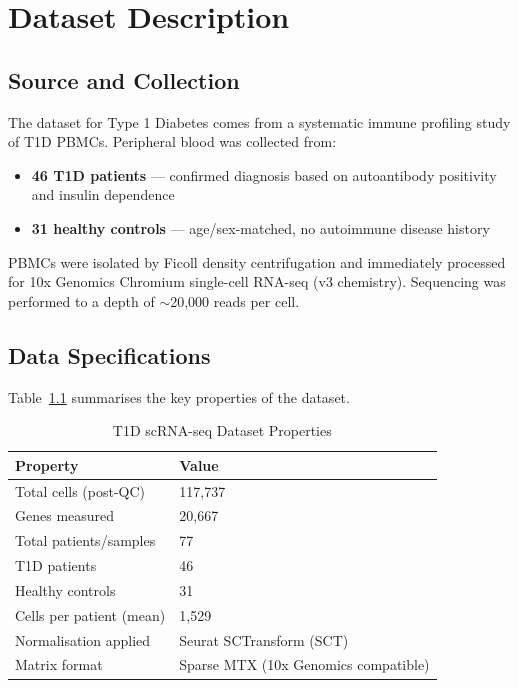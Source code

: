 \chapter{Dataset Description}
\label{chap:dataset}

\section{Source and Collection}

The dataset for Type 1 Diabetes comes from a systematic immune profiling study of T1D PBMCs. Peripheral blood was collected from:
\begin{itemize}
    \item \textbf{46 T1D patients} --- confirmed diagnosis based on autoantibody positivity and insulin dependence
    \item \textbf{31 healthy controls} --- age/sex-matched, no autoimmune disease history
\end{itemize}

PBMCs were isolated by Ficoll density centrifugation and immediately processed for 10x Genomics Chromium single-cell RNA-seq (v3 chemistry). Sequencing was performed to a depth of $\sim$20,000 reads per cell.

\section{Data Specifications}

Table~\ref{tab:dataset_t1d} summarises the key properties of the dataset.

\begin{table}[h!]
\centering
\caption{T1D scRNA-seq Dataset Properties}
\label{tab:dataset_t1d}
\begin{tabular}{ll}
\toprule
\textbf{Property} & \textbf{Value} \\
\midrule
Total cells (post-QC) & 117,737 \\
Genes measured & 20,667 \\
Total patients/samples & 77 \\
T1D patients & 46 \\
Healthy controls & 31 \\
Cells per patient (mean) & 1,529 \\
Normalisation applied & Seurat SCTransform (SCT) \\
Matrix format & Sparse MTX (10x Genomics compatible) \\
\bottomrule
\end{tabular}
\end{table}

